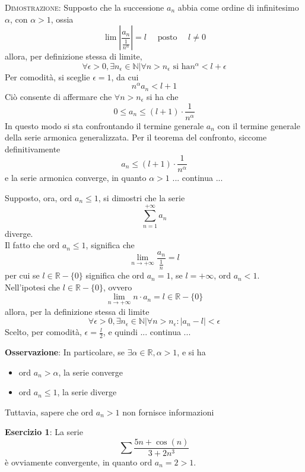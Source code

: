 \documentclass[a4paper]{extarticle}
\begin{document}
\vspace{2em}
\noindent
\normalfont \normalsize
\textsc{Dimostrazione}: Supposto che la successione $a_n$ abbia come ordine di infinitesimo $\alpha$, con $\alpha > 1$, ossia
\[\lim \left \vert \frac{a_n}{\frac{1}{n^\alpha}}\right \vert = l \hspace{1em} \text{ posto } \hspace{1em} l \neq 0\]
allora, per definizione stessa di limite,
\[\forall \epsilon > 0, \exists n_\epsilon \in \mathbb{N} \vert \forall n > n_\epsilon \text{ si ha} n^\alpha < l + \epsilon\]
Per comodità, si sceglie $\epsilon = 1$, da cui
\[n^\alpha a_n < l+1\]
Ciò consente di affermare che $\forall n > n_\epsilon$ si ha che
\[0 \leq a_n \leq (l+1) \cdot \frac{1}{n^\alpha}\]
In questo modo si sta confrontando il termine generale $a_n$ con il termine generale della serie armonica generalizzata. Per il teorema del confronto, siccome definitivamente
\[a_n \leq (l+1) \cdot \frac{1}{n^\alpha}\]
e la serie armonica converge, in quanto $\alpha > 1$ ... continua ...

\vspace{1em}
\noindent
Supposto, ora, $\text{ord } a_n \leq 1$, si dimostri che la serie
\[\sum_{n=1}^{+\infty}a_n\]
diverge.\\
Il fatto che $\text{ord } a_n \leq 1$, significa che
\[\lim_{n \to +\infty} \frac{a_n}{\frac{1}{n}} = l\]
per cui se $l \in \mathbb{R} - \{0\}$ significa che $\text{ord } a_n = 1$, se $l = +\infty$, $\text{ord } a_n < 1$.\\
Nell'ipotesi che $l \in \mathbb{R} - \{0\}$, ovvero
\[\lim_{n \to +\infty} n \cdot a_n = l \in \mathbb{R} - \{0\}\] allora, per la definizione stessa di limite
\[\forall \epsilon > 0, \exists n_\epsilon \in \mathbb{N} \vert \forall n > n_\epsilon : \left \vert a_n-l \right \vert < \epsilon\]
Scelto, per comodità, $\epsilon=\frac{l}{2}$, e quindi ... continua ...
\[\]

\vspace{1em}
\noindent
\textbf{Osservazione}: In particolare, se $\exists \alpha \in \mathbb{R}, \alpha>1$, e si ha
\begin{itemize}
    \item $\text{ord } a_n > \alpha$, la serie converge
    \item $\text{ord } a_n \leq 1$, la serie diverge
\end{itemize}
Tuttavia, sapere che $\text{ord } a_n > 1$ non fornisce informazioni

\vspace{1em}
\noindent
\textbf{Esercizio 1}: La serie
\[\sum \frac{5n + \cos(n)}{3 + 2n^3}\]
è ovviamente convergente, in quanto $\text{ord } a_n = 2 > 1$.
\end{document}
